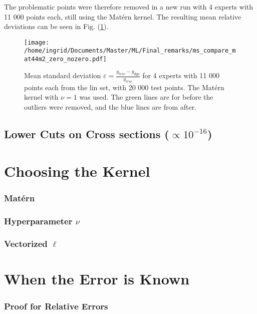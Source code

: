 \documentclass[twoside,english]{uiofysmaster}
\begin{document}
The problematic points were therefore removed in a new run with 4 experts with 11 000 points each, still using the Mat\'{e}rn kernel. The resulting mean relative deviations can be seen in Fig. (\ref{Fig:: ms mat44m2 zeros nozeros}).

\begin{figure}
\centering
\texttt{[image: /home/ingrid/Documents/Master/ML/Final\_remarks/ms\_compare\_mat44m2\_zero\_nozero.pdf]}
\caption{Mean standard deviation $\varepsilon = \frac{y_{true} - y_{dgp}}{y_{true}}$ for 4 experts with 11 000 points each from the lin set, with 20 000 test points. The Mat\'{e}rn kernel with $\nu = 1$ was used. The green lines are for before the outliers were removed, and the blue lines are from after.}
\label{Fig:: ms mat44m2 zeros nozeros}
\end{figure}



\subsection{Lower Cuts on Cross sections ($\propto 10^{-16}$)}


\section{Choosing the Kernel}

\subsubsection{Mat\'{e}rn}

\subsubsection{Hyperparameter $\nu$}

\subsubsection{Vectorized $\ell$}


\section{When the Error is Known}

\subsubsection{Proof for Relative Errors}
\end{document}
